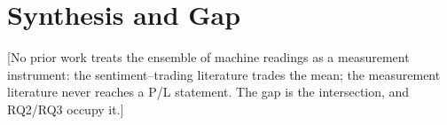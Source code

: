 \section{Synthesis and Gap}
\label{sec:lit-gap}

[No prior work treats the ensemble of machine readings as a
measurement instrument: the sentiment--trading literature trades the
mean; the measurement literature never reaches a P/L statement. The
gap is the intersection, and RQ2/RQ3 occupy it.]
